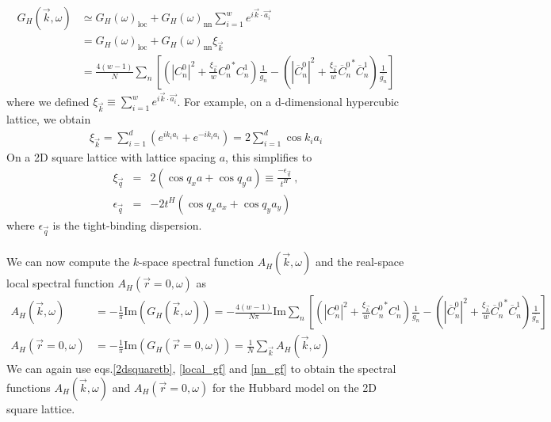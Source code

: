 \documentclass{article}
\numberwithin{equation}{section}
\begin{document}
\begin{equation}\begin{aligned}
	\label{k_Gf}
	G_H (\vec k, \omega) &\simeq G_H (\omega)_\text{loc} + G_H (\omega)_\text{nn}\sum_{i=1}^w e^{i \vec{k}\cdot\vec {a_i}}\\
			     &= G_H (\omega)_\text{loc} + G_H (\omega)_\text{nn} \xi_{\vec k}\\
			     &= \frac{4(w-1)}{N}\sum_n\left[\left(|C^0_{n}|^2 + \frac{\xi_{\vec{k}}}{w}{C^0_{n}}^* C^1_{n} \right)\frac{1}{g_n} - \left(|\overline C^0_{n}|^2 + \frac{\xi_{\vec{k}}}{w}{\overline C^0_{n}}^* \overline C^1_{n}\right)\frac{1}{\overline{g_n}}\right]
\end{aligned}\end{equation}
where we defined \(\xi_{\vec k} \equiv \sum_{i=1}^w e^{i \vec{k}\cdot\vec {a_i}}\). For example, on a d-dimensional hypercubic lattice, we obtain
\begin{equation}\begin{aligned}
	\xi_{\vec k} = \sum_{i=1}^d \left(e^{i k_i {a_i}} + e^{-i k_i {a_i}}\right) = 2\sum_{i=1}^d \cos k_i a_i
\end{aligned}\end{equation}
On a 2D square lattice with lattice spacing $a$, this simplifies to
\begin{eqnarray}
	\label{2dsquaretb}
\xi_{\vec{q}} &=& 2(\cos q_{x}a + \cos q_{y}a)\equiv \frac{-\epsilon_{\vec{q}}}{t^{H}}~,\nonumber\\
\epsilon_{\vec{q}} &=& -2t^{H}(\cos q_{x}a_{x} + \cos q_{y}a_{y})~
\end{eqnarray}
where \(\epsilon_{\vec{q}}\) is the tight-binding dispersion.
\\\\
We can now compute the $k$-space spectral function $A_{H}(\vec{k},\omega)$ and the real-space local spectral function $A_{H}(\vec{r}=0,\omega)$ as
\begin{equation}\begin{aligned}
	A_{H}(\vec{k},\omega) &= -\frac{1}{\pi} \textrm{Im}(G_{H}(\vec{k},\omega)) = -\frac{4(w-1)}{N\pi} \textrm{Im}\sum_n\left[\left(|C^0_{n}|^2 + \frac{\xi_{\vec{k}}}{w}{C^0_{n}}^* C^1_{n} \right)\frac{1}{g_n} - \left(|\overline C^0_{n}|^2 + \frac{\xi_{\vec{k}}}{w}{\overline C^0_{n}}^* \overline C^1_{n}\right)\frac{1}{\overline{g_n}}\right]\\
A_{H}(\vec{r}=0,\omega) &= -\frac{1}{\pi} \textrm{Im}(G_{H}(\vec{r}=0,\omega)) = \frac{1}{N}\sum_{\vec{k}}A_{H}(\vec{k},\omega)
\end{aligned}\end{equation}
We can again use eqs.\eqref{2dsquaretb}, \eqref{local_gf} and \eqref{nn_gf} to obtain the spectral functions  $A_{H} (\vec{k},\omega)$ and $A_{H} (\vec{r}=0,\omega)$ for the Hubbard model on the 2D square lattice.
\end{document}
